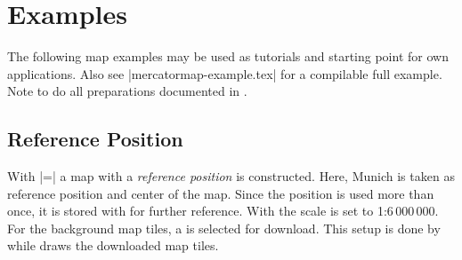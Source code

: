 \clearpage
\section{Examples}\label{sec:examples}%

The following map examples may be used as tutorials and
starting point for own applications.
Also see |mercatormap-example.tex| for a compilable full example.
Note to do all preparations documented in .


\subsection{Reference Position}

With |=| a map with a
\emph{reference position} is constructed. Here, Munich is taken as
reference position and center of the map. Since the position is used
more than once, it is stored with  for further reference.
With  the scale
is set to 1:6\,000\,000. For the background map tiles, a
 is selected for download.
This setup is done by  while  draws
the downloaded map tiles.


